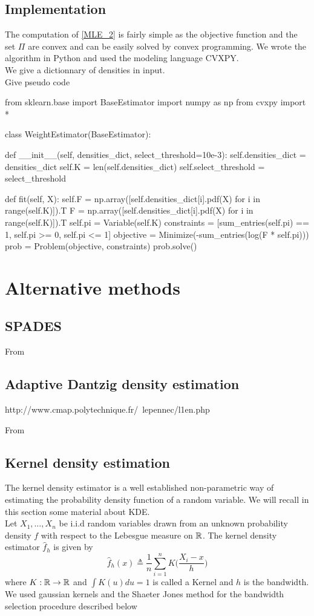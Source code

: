 \subsection{Implementation}
The computation of \cref{MLE_2} is fairly simple as the objective function and the set $\Pi$ are convex and can be easily solved by convex programming. We wrote the algorithm in Python and used the modeling language CVXPY\cite{cvxpy}.\\
We give a dictionnary of densities in input.\\
Give pseudo code
\begin{python}
from sklearn.base import BaseEstimator
import numpy as np
from cvxpy import *


class WeightEstimator(BaseEstimator):

    def __init__(self, densities_dict, select_threshold=10e-3):
        self.densities_dict  = densities_dict
        self.K = len(self.densities_dict)
        self.select_threshold = select_threshold

    def fit(self, X):
        self.F = np.array([self.densities_dict[i].pdf(X) for i in range(self.K)]).T
        F = np.array([self.densities_dict[i].pdf(X) for i in range(self.K)]).T
        self.pi = Variable(self.K)
        constraints = [sum_entries(self.pi) == 1, self.pi >= 0, self.pi <= 1]
        objective = Minimize(-sum_entries(log(F * self.pi)))
        prob = Problem(objective, constraints)
        prob.solve()
\end{python}

\section{Alternative methods}
\subsection{SPADES}
From \cite{SPADES}
\subsection{Adaptive Dantzig density estimation}
http://www.cmap.polytechnique.fr/~lepennec/l1en.php

From \cite{Bertin}
\subsection{Kernel density estimation}

The kernel density estimator is a well established non-parametric way of estimating the probability density function of a random variable. We will recall in this section some material about KDE.\\
Let $X_1,\dots,X_n$ be i.i.d random variables drawn from an unknown probability density $f$ with respect to the Lebesgue measure on ${\mathbb R}$. The kernel density estimator $\hat f_h $ is given by
\begin{equation}
	\hat f_h(x) \triangleq \frac{1}{n}\sum_{i=1}^nK\Big(\frac{X_i-x}{h}\Big)
\end{equation}
where $K:{\mathbb R} \rightarrow {\mathbb R}$ and $\int K(u)du = 1$ is called a Kernel and $h$ is the bandwidth. We used gaussian kernels and the Shaeter Jones method for the bandwidth selection procedure described below

